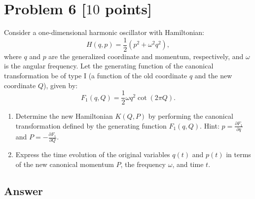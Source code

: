 \documentclass[11pt, a4paper]{article} %
\begin{document}
\newpage
\section*{Problem 6 [$10$ points]}
Consider a one-dimensional harmonic oscillator with Hamiltonian:
\begin{equation*}
    H(q, p) = \frac{1}{2}\left(p^2 + \omega^2 q^2\right),
\end{equation*}
where $q$ and $p$ are the generalized coordinate and momentum, respectively, and $\omega$ is the angular frequency. Let the generating function of the canonical transformation be of type I (a function of the old coordinate $q$ and the new coordinate $Q$), given by:
\begin{equation*}
    F_1(q, Q) = \frac{1}{2} \omega q^2 \cot(2\pi Q).
\end{equation*}

\begin{enumerate}
    \item[(1)] Determine the new Hamiltonian $K(Q, P)$ by performing the canonical transformation defined by the generating function $F_1(q, Q)$. Hint: $p=\frac{\partial F_1}{\partial q}$ and $P=-\frac{\partial F_1}{\partial Q}$.

    \item[(2)] Express the time evolution of the original variables $q(t)$ and $p(t)$ in terms of the new canonical momentum $P$, the frequency $\omega$, and time $t$.
\end{enumerate}

\subsection*{Answer}
\end{document}
